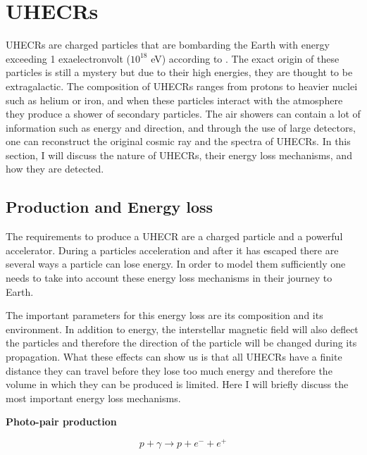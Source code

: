  

\section{UHECRs}

UHECRs are charged particles that are bombarding the Earth with energy exceeding 1 exaelectronvolt ($10^{18}$ eV) according to \cite{Alves_Batista_2019}. The exact origin of 
these particles is still a mystery but due to their high energies, they are thought to be extragalactic.
The composition of UHECRs ranges from protons to heavier nuclei such as helium or iron, and when these particles interact with the atmosphere they produce a shower of secondary particles.
The air showers can contain a lot of information such as energy and  direction, and through the use of large detectors, one can reconstruct the original cosmic ray and the spectra of UHECRs. In this section, I will discuss the nature of UHECRs, their energy loss mechanisms, and how they are detected.


\subsection{Production and Energy loss}
The requirements to produce a UHECR are a charged particle and a powerful accelerator. During a particles acceleration and after it has escaped there are several ways a particle can lose energy.
In order to model them sufficiently one needs to take into account these energy loss mechanisms in their journey to Earth. 

The important parameters for this energy loss are its composition and its environment. In addition to energy, the interstellar magnetic field will also deflect the particles and therefore the direction of the particle will be changed during its propagation. 
What these effects can show us is that all UHECRs have a finite distance they can travel before they lose too much energy and therefore the volume in which they can be produced is limited.
Here I will briefly discuss the most important energy loss mechanisms.

\textbf{Photo-pair production}

\begin{equation}
    p + \gamma \rightarrow p + e^- + e^+
\end{equation}

